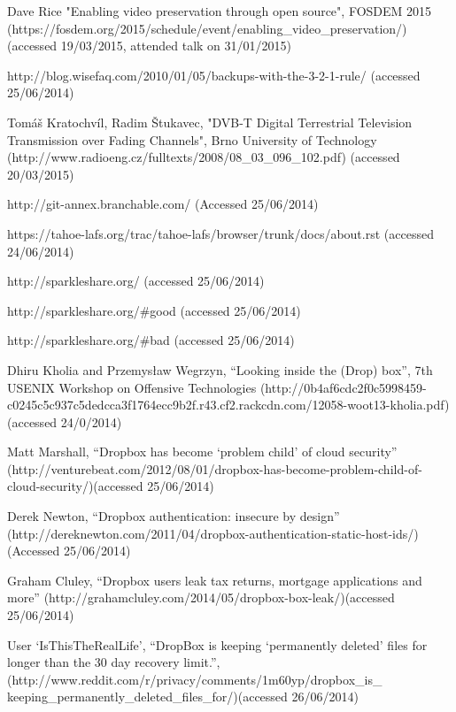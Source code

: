 \documentclass[12pt,a4paper,]{adreport}
\begin{document}
\begin{thebibliography}{9}

 Dave Rice "Enabling video preservation through open source", FOSDEM 2015 (https://fosdem.org/2015/schedule/event/enabling\_video\_preservation/) (accessed 19/03/2015, attended talk on 31/01/2015)

 http://blog.wisefaq.com/2010/01/05/backups-with-the-3-2-1-rule/
  (accessed 25/06/2014)
  
 Tomáš Kratochvíl, Radim Štukavec,  "DVB-T Digital Terrestrial Television Transmission over Fading Channels",  Brno University of Technology (http://www.radioeng.cz/fulltexts/2008/08\_03\_096\_102.pdf) (accessed 20/03/2015)

 http://git-annex.branchable.com/ (Accessed 25/06/2014)

  https://tahoe-lafs.org/trac/tahoe-lafs/browser/trunk/docs/about.rst
  (accessed 24/06/2014)
  
 http://sparkleshare.org/ (accessed 25/06/2014)

 http://sparkleshare.org/\#good  (accessed 25/06/2014)

 http://sparkleshare.org/\#bad  (accessed 25/06/2014)

 Dhiru Kholia and
  Przemysław Wegrzyn, ``Looking inside the (Drop) box'', 7th USENIX
  Workshop on Offensive Technologies
  (http://0b4af6cdc2f0c5998459-c0245c5c937c5dedcca3f1764ecc9b2f.r43.cf2.rackcdn.com/12058-woot13-kholia.pdf)
  (accessed 24/0/2014)
  
 Matt Marshall, ``Dropbox has become `problem child' of
  cloud security''
  (http://venturebeat.com/2012/08/01/dropbox-has-become-problem-child-of-cloud-security/)(accessed
  25/06/2014)
  
 Derek Newton, ``Dropbox authentication:
  insecure by design''
  (http://dereknewton.com/2011/04/dropbox-authentication-static-host-ids/)(Accessed
  25/06/2014)
  
 Graham Cluley, ``Dropbox users leak tax
  returns, mortgage applications and more''
  (http://grahamcluley.com/2014/05/dropbox-box-leak/)(accessed
  25/06/2014)
  
 User `IsThisTheRealLife',
  ``DropBox is keeping `permanently deleted' files for longer than the
  30 day recovery limit.'',
  (http://www.reddit.com/r/privacy/comments/1m60yp/dropbox\_is\_
  keeping\_permanently\_deleted\_files\_for/)(accessed
  26/06/2014)
  

\end{thebibliography}
\end{document}
